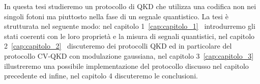 In questa tesi studieremo un protocollo di QKD che utilizza una codifica non nei singoli fotoni ma piuttosto nella fase di un segnale quantistico. La tesi è strutturata nel seguente modo: nel capitolo 1~\ref{cap:capitolo_1}~ introdurremo gli stati coerenti con le loro propriet\`a e la misura di segnali quantistici, nel capitolo 2~\ref{cap:capitolo_2}~ discuteremo dei protocolli QKD ed in particolare del protocollo CV-QKD con modulazione gaussiana,  nel capitolo 3~\ref{cap:capitolo_3}~ illustreremo una possibile implementazione del protocollo discusso nel capitolo precedente ed infine, nel capitolo 4 discuteremo le conclusioni.


























